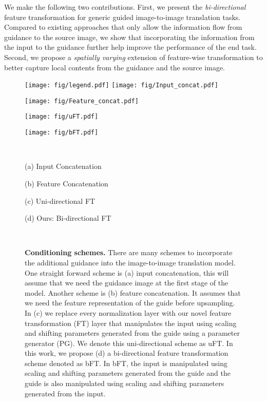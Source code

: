 \documentclass[10pt,twocolumn,letterpaper]{article}
\newlength\secmargin
\newlength\figcapmargin
\newcommand{\mpage}[2]
{
\begin{minipage}{#1\linewidth}\centering
#2
\end{minipage}
}
\begin{document}
We make the following two contributions. First, we present the \emph{bi-directional} feature transformation for generic guided image-to-image translation tasks. Compared to existing approaches that only allow the information flow from guidance to the source image, we show that incorporating the information from the input to the guidance further help improve the performance of the end task. Second, we propose a \emph{spatially varying} extension of feature-wise transformation to better capture local contents from the guidance and the source image.



\begin{figure*}[t]    \centering
\mpage{0.24}{\texttt{[image: fig/legend.pdf]} \texttt{[image: fig/Input\_concat.pdf]}} \hfill
\mpage{0.24}{\texttt{[image: fig/Feature\_concat.pdf]}}\hfill
\mpage{0.24}{\texttt{[image: fig/uFT.pdf]}} \hfill
\mpage{0.24}{\texttt{[image: fig/bFT.pdf]}} \\
\vspace{1.0mm}
\mpage{0.24}{(a) Input Concatenation} \hfill
\mpage{0.24}{(b) Feature Concatenation}\hfill
\mpage{0.24}{(c) Uni-directional FT} \hfill
\mpage{0.24}{(d) Ours: Bi-directional FT} \\
\vspace{1.0mm}
\vspace{\figcapmargin}
\caption{\textbf{Conditioning schemes.} 
There are many schemes to incorporate the additional guidance into the image-to-image translation model. 
One straight forward scheme is (a) input concatenation, this will assume that we need the guidance image at the first stage of the model. 
Another scheme is (b) feature concatenation. It assumes that we need the feature representation of the guide before upsampling. 
In (c) we replace every normalization layer with our novel feature transformation (FT) layer that manipulates the input using scaling and shifting parameters generated from the guide using a parameter generator (PG). We denote this uni-directional scheme as uFT.
In this work, we propose (d) a bi-directional feature transformation scheme denoted as bFT. In bFT, the input is manipulated using scaling and shifting parameters generated from the guide and the guide is also manipulated using scaling and shifting parameters generated from the input.
}


\label{fig:motivation}
\end{figure*}  
\vspace{\secmargin}
\end{document}
